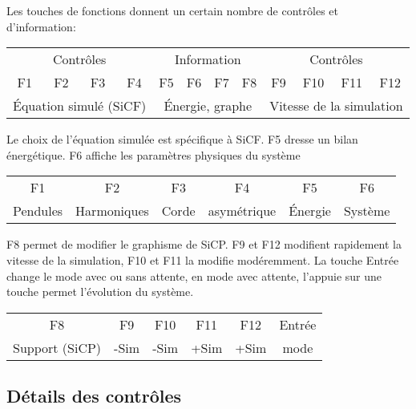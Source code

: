 Les touches de fonctions donnent un certain nombre de contrôles et d'information:
%
\begin{center}
\begin{tabular}{ccccc ccccc cc}
\multicolumn{4}{|c|}{Contrôles} & \multicolumn{4}{c}{Information} & \multicolumn{4}{|c|}{Contrôles}\\
\sf F1 &\sf F2 &\sf F3 &\sf F4 &\sf F5 &\sf F6 &\sf F7 &\sf F8 &\sf F9 &\sf F10 &\sf F11 &\sf F12 \\
\multicolumn{4}{|c|}{Équation simulé (SiCF)} & \multicolumn{4}{c}{Énergie, graphe} & \multicolumn{4}{|c|}{Vitesse de la simulation}\\
\end{tabular}
\end{center}
%
Le choix de l'équation simulée est spécifique à SiCF. {\sf F5} dresse un bilan énergétique. {\sf F6} affiche les paramètres physiques du système
\begin{center}
\begin{tabular}{cccccc}
\sf F1 &\sf F2 &\sf F3 &\sf F4 &\sf F5 &\sf F6\\
Pendules & Harmoniques & Corde & asymétrique & Énergie & Système \\
\end{tabular}
\end{center}
%
F8 permet de modifier  le graphisme de SiCP. {\sf F9} et {\sf F12} modifient rapidement la vitesse de la simulation, {\sf F10} et {\sf F11} la modifie modéremment. La touche {\sf Entrée} change le mode avec ou sans attente, en mode avec attente, l'appuie sur une touche permet l'évolution du système.
\begin{center}
\begin{tabular}{cccccc}
\sf F8 &\sf F9 &\sf F10 &\sf F11 &\sf F12 & \sf Entrée \\
Support (SiCP) & -Sim & -Sim & +Sim & +Sim & mode\\
\end{tabular}
\end{center}
%
\subsection{Détails des contrôles}
%
%

